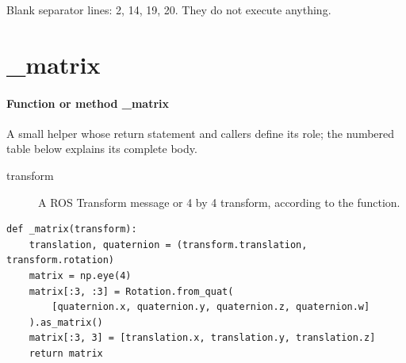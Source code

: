 \documentclass[11pt,a4paper]{book}
\begin{document}
Blank separator lines: 2, 14, 19, 20. They do not execute anything.

\section{\_matrix}

\paragraph{Function or method \_matrix}
A small helper whose return statement and callers define its role; the numbered table below explains its complete body.

\begin{description}
\item[transform] A ROS Transform message or 4 by 4 transform, according to the function.
\end{description}

\begin{lstlisting}[firstnumber=21]
def _matrix(transform):
    translation, quaternion = (transform.translation, transform.rotation)
    matrix = np.eye(4)
    matrix[:3, :3] = Rotation.from_quat(
        [quaternion.x, quaternion.y, quaternion.z, quaternion.w]
    ).as_matrix()
    matrix[:3, 3] = [translation.x, translation.y, translation.z]
    return matrix


\end{lstlisting}
\end{document}
